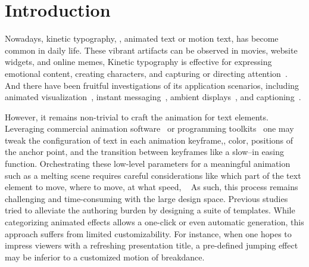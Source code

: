 \section{Introduction}
Nowadays, kinetic typography, \ie, animated text or motion text, has become common in daily life.
These vibrant artifacts can be observed in movies, website widgets, and online memes, 
Kinetic typography is effective for expressing emotional content, creating characters, and capturing or directing attention~\cite{shannon1998kinetic, lee2002engine}.
And there have been fruitful investigations of its application scenarios, including animated visualization~\cite{xie2023emordle}, instant messaging~\cite{gaylord2015body,kim2016yo}, ambient displays~\cite{minakuchi2008kinetic}, and captioning~\cite{Lee07EmotiveCaptioning}.

However, it remains non-trivial to craft the animation for text elements.
Leveraging commercial animation software~\cite{motion, aftereffects} or programming toolkits~\cite{lee2002engine} one may tweak the configuration of text in each animation keyframe,\eg, color, positions of the anchor point, and the transition between keyframes like a slow--in easing function.
Orchestrating these low-level parameters for a meaningful animation such as a melting scene requires careful considerations like which part of the text element to move, where to move, at what speed, \etc~  
As such, this process remains challenging and time-consuming with the large design space.
Previous studies~\cite{yeo2008kim, Lee07EmotiveCaptioning} tried to alleviate the authoring burden by designing a suite of templates.
While categorizing animated effects allows a one-click or even automatic generation, this approach suffers from limited customizability.
For instance, when one hopes to impress viewers with a refreshing presentation title, a pre-defined jumping effect may be inferior to a customized motion of breakdance.



